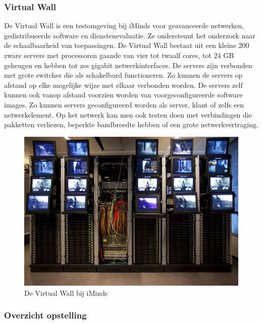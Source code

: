 \subsubsection{Virtual Wall}

De Virtual Wall is een testomgeving bij iMinds voor geavanceerde netwerken, gedistribueerde software en dienstenevaluatie.
Ze ondersteunt het onderzoek naar de schaalbaarheid van toepassingen.
De Virtual Wall bestaat uit een kleine 200 zware servers met processoren gaande van vier tot twaalf cores,
tot 24 GB geheugen en hebben tot zes gigabit netwerkinterfaces.
De servers zijn verbonden met grote switches die als schakelbord functioneren.
Zo kunnen de servers op afstand op elke mogelijke wijze met elkaar verbonden worden.
De servers zelf kunnen ook vanop afstand voorzien worden van voorgeconfigureerde software images.
Zo kunnen servers geconfigureerd worden als server, klant of zelfs een netwerkelement.
Op het netwerk kan men ook testen doen met verbindingen die pakketten verliezen, beperkte bandbreedte hebben of
een grote netwerkvertraging\cite{virtual-wall-uitleg, virtual-wall-specs}.

\begin{figure}[h]
	\centering
	\includegraphics[scale=0.50]{figures/virtual-wall}
	\caption{De Virtual Wall bij iMinds\cite{virtual-wall-specs}}
	\label{fig-virtual-wall}
\end{figure}

\subsubsection{Overzicht opstelling}


